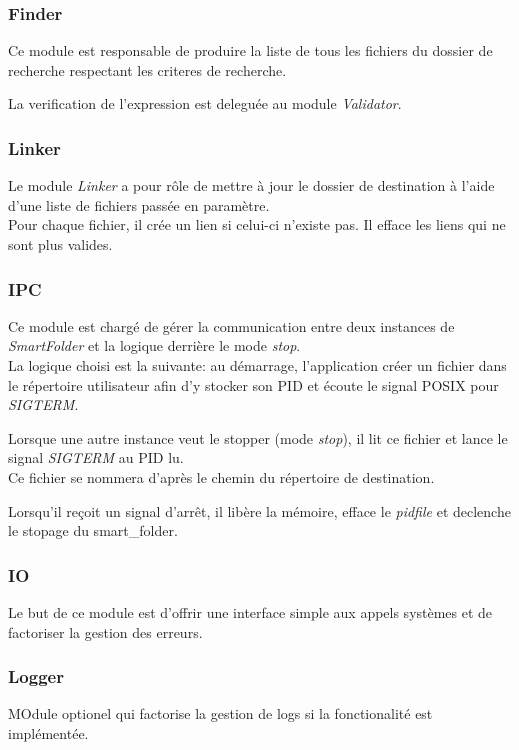 \documentclass[11pt, a4paper]{article}
\begin{document}
\subsubsection{Finder}
Ce module est responsable de produire la liste de tous les fichiers du dossier de recherche respectant les criteres de recherche.

La verification de l'expression est deleguée au module \textit{Validator}.

\subsubsection{Linker}
Le module \textit{Linker} a pour rôle de mettre à jour le dossier de destination
à l'aide d'une liste de fichiers passée en paramètre. \\

Pour chaque fichier, il crée un lien si celui-ci n'existe pas. Il efface les liens qui ne sont plus valides.

\subsubsection{IPC}
\label{sec:ipc}
Ce module est chargé de gérer la communication entre deux instances de \textit{SmartFolder}
et la logique derrière le mode \textit{stop}. \\

La logique choisi est la suivante: au démarrage, l'application créer un fichier dans le répertoire utilisateur
afin d'y stocker son PID et écoute le signal POSIX pour \textit{SIGTERM}.

Lorsque une autre instance veut le stopper (mode \textit{stop}), il lit ce fichier
et lance le signal \textit{SIGTERM} au PID lu. \\

Ce fichier se nommera d'après le chemin du répertoire de destination.

Lorsqu'il reçoit un signal d'arrêt, il libère la mémoire, efface le \textit{pidfile} et declenche le stopage du smart\_folder. \\

\subsubsection{IO}
Le but de ce module est d'offrir une interface simple aux appels systèmes et de factoriser la gestion des erreurs.

\subsubsection{Logger}
MOdule optionel qui factorise la gestion de logs si la fonctionalité est implémentée.
\end{document}
